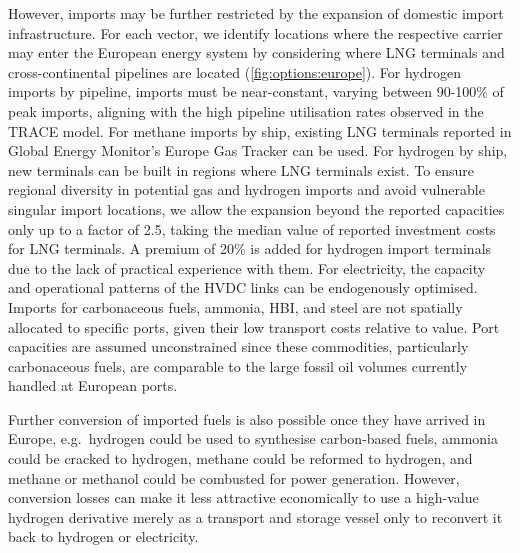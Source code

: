 
However, imports may be further restricted by the expansion of domestic import
infrastructure. For each vector, we identify locations where the respective
carrier may enter the European energy system by considering where LNG terminals
and cross-continental pipelines are located (\cref{fig:options:europe}). For
hydrogen imports by pipeline, imports must be near-constant, varying between
90-100\% of peak imports, aligning with the high pipeline utilisation rates
observed in the TRACE model. For methane imports by ship, existing LNG terminals
reported in Global Energy Monitor's Europe Gas
Tracker\cite{globalenergymonitorEuropeGasTracker2024} can be used. For hydrogen
by ship, new terminals can be built in regions where LNG terminals exist. To
ensure regional diversity in potential gas and hydrogen imports and avoid
vulnerable singular import locations, we allow the expansion beyond the reported
capacities only up to a factor of 2.5, taking the median value of reported
investment costs for LNG terminals.\cite{GlobalGas2022} A premium of 20\% is
added for hydrogen import terminals due to the lack of practical experience with
them. For electricity, the capacity and operational patterns of the HVDC links
can be endogenously optimised. Imports for carbonaceous fuels, ammonia, HBI, and
steel are not spatially allocated to specific ports, given their low transport
costs relative to value. Port capacities are assumed unconstrained since these
commodities, particularly carbonaceous fuels, are comparable to the large fossil
oil volumes currently handled at European ports.


Further conversion of imported fuels is also possible once they have arrived in
Europe, e.g.~hydrogen could be used to synthesise carbon-based fuels, ammonia
could be cracked to hydrogen, methane could be reformed to hydrogen, and methane
or methanol could be combusted for power generation. However, conversion losses
can make it less attractive economically to use a high-value hydrogen derivative
merely as a transport and storage vessel only to reconvert it back to hydrogen
or electricity.


